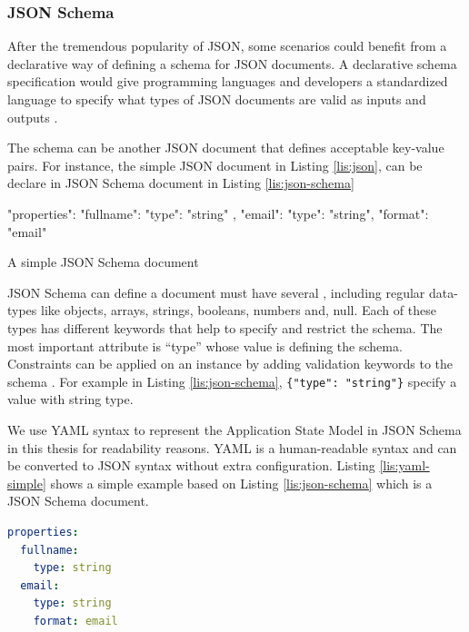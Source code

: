 \subsubsection{JSON Schema}
After the tremendous popularity of JSON, some scenarios could benefit from a declarative way of defining a schema for JSON documents.
A declarative schema specification would give programming languages and developers a standardized language to specify what types of JSON documents are valid as inputs and outputs \cite{json-schema}.

The schema can be another JSON document that defines acceptable key-value pairs.
For instance, the simple JSON document in Listing \ref{lis:json}, can be declare in JSON Schema document in Listing \ref{lis:json-schema}

\FloatBarrier
\begin{code}
\begin{json}
{
    "properties": {
        "fullname": {
            "type": "string"
        },
        "email": {
            "type": "string",
            "format": "email"
        }
    }
}
\end{json}
\caption{A simple JSON Schema document}
\label{lis:json-schema}
\end{code}
\FloatBarrier

JSON Schema can define a document must have several , including regular data-types like objects, arrays, strings, booleans, numbers and, null. Each of these types has different keywords that help to specify and restrict the schema. The most important attribute is “type” whose value is defining the schema. Constraints can be applied on an instance by adding validation keywords to the schema \cite{json-model}. For example in Listing \ref{lis:json-schema}, \lstinline[basicstyle=\ttfamily]|{"type": "string"}| specify a value with string type.

We use YAML syntax to represent the Application State Model in JSON Schema in this thesis for readability reasons. YAML is a human-readable syntax and can be converted to JSON syntax without extra configuration. Listing \ref{lis:yaml-simple} shows a simple example based on Listing \ref{lis:json-schema} which is a JSON Schema document.


\lstset{
  label=lis:yaml-simple, caption=Example of expressing JSON Schema in YAML syntax., 
}
\begin{lstlisting}[language=yaml]
properties:
  fullname:
    type: string
  email:
    type: string
    format: email
\end{lstlisting}


